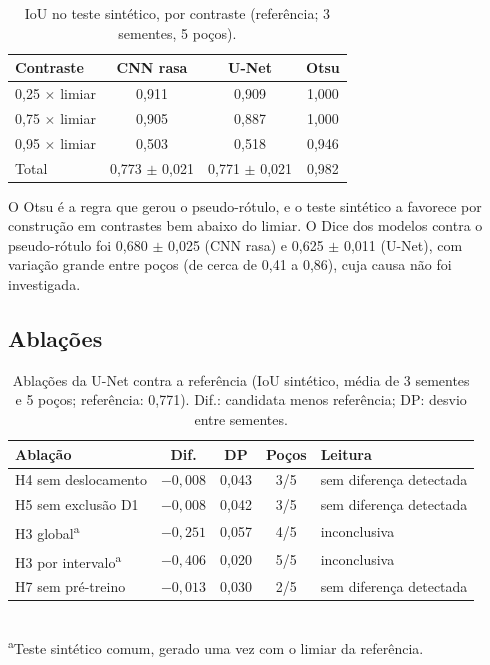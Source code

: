 \documentclass[12pt]{article}
\newif\ifrascunho \rascunhofalse
\newcommand{\fonte}[1]{\ifrascunho\textcolor{blue}{\small(README, #1)}\fi}
\begin{document}
\begin{table}[ht]
\centering
\caption{IoU no teste sintético, por contraste (referência; 3 sementes, 5 poços).}
\label{tab:sint}
\begin{tabular}{lccc}
\toprule
Contraste & CNN rasa & U-Net & Otsu \\
\midrule
0,25 $\times$ limiar & 0,911 & 0,909 & 1,000 \\
0,75 $\times$ limiar & 0,905 & 0,887 & 1,000 \\
0,95 $\times$ limiar & 0,503 & 0,518 & 0,946 \\
Total & 0,773 $\pm$ 0,021 & 0,771 $\pm$ 0,021 & 0,982 \\
\bottomrule
\end{tabular}
\end{table}

O Otsu é a regra que gerou o pseudo-rótulo, e o teste sintético a favorece por construção em contrastes bem abaixo do limiar. O Dice dos modelos contra o pseudo-rótulo foi 0,680 $\pm$ 0,025 (CNN rasa) e 0,625 $\pm$ 0,011 (U-Net), com variação grande entre poços (de cerca de 0,41 a 0,86), cuja causa não foi investigada. \fonte{item 67}

\subsection{Ablações}

\begin{table}[ht]
\centering
\caption{Ablações da U-Net contra a referência (IoU sintético, média de 3 sementes e 5 poços; referência: 0,771). Dif.: candidata menos referência; DP: desvio entre sementes.}
\label{tab:abl}
\small
\begin{tabular}{lcccl}
\toprule
Ablação & Dif. & DP & Poços & Leitura \\
\midrule
H4 sem deslocamento & $-0{,}008$ & 0,043 & 3/5 & sem diferença detectada \\
H5 sem exclusão D1 & $-0{,}008$ & 0,042 & 3/5 & sem diferença detectada \\
H3 global\textsuperscript{a} & $-0{,}251$ & 0,057 & 4/5 & inconclusiva \\
H3 por intervalo\textsuperscript{a} & $-0{,}406$ & 0,020 & 5/5 & inconclusiva \\
H7 sem pré-treino & $-0{,}013$ & 0,030 & 2/5 & sem diferença detectada \\
\bottomrule
\end{tabular}
\\[2pt]
\footnotesize \textsuperscript{a}Teste sintético comum, gerado uma vez com o limiar da referência. \fonte{itens 75 e 77; código em \texttt{src/synth/comum.py}; conferência na seção 5.10 do notebook 05}
\end{table}
\end{document}
